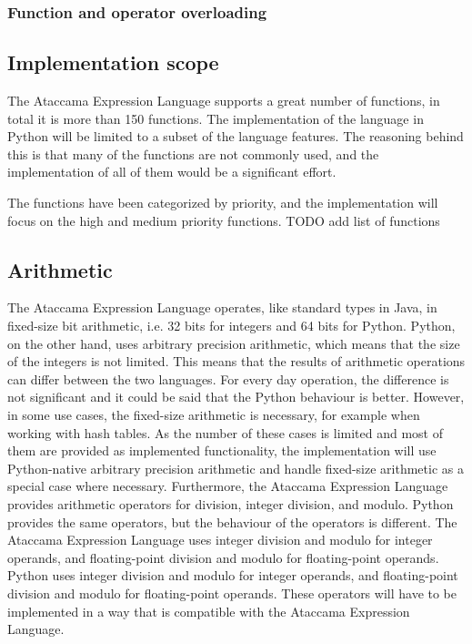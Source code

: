 \subsubsection{Function and operator overloading}

\subsection{Implementation scope}

The Ataccama Expression Language supports a great number of functions, in
total it is more than 150 functions.
The implementation of the language in Python will be limited to a subset of
the language features. The reasoning behind this is that many of the functions are
not commonly used, and the implementation of all of them would be a significant
effort.

The functions have been categorized by priority, and the implementation will
focus on the high and medium priority functions.
TODO add list of functions

\subsection{Arithmetic}
The Ataccama Expression Language operates, like standard types in Java, in
fixed-size bit arithmetic, i.e. 32 bits for integers and 64 bits for Python. Python,
on the other hand, uses arbitrary precision arithmetic, which means that the size
of the integers is not limited. This means that the results of arithmetic operations
can differ between the two languages.
For every day operation, the difference is not significant and it could be said
that the Python behaviour is better. However, in some use cases, the fixed-size
arithmetic is necessary, for example when working with hash tables. As the number
of these cases is limited and most of them are provided as implemented functionality,
the implementation will use Python-native arbitrary precision arithmetic and
handle fixed-size arithmetic as a special case where necessary.
Furthermore, the Ataccama Expression Language provides arithmetic operators
for division, integer division, and modulo. Python provides the same operators, but
the behaviour of the operators is different. The Ataccama Expression Language
uses integer division and modulo for integer operands, and floating-point division
and modulo for floating-point operands. Python uses integer division and modulo
for integer operands, and floating-point division and modulo for floating-point
operands. These operators will have to be implemented in a way that is compatible
with the Ataccama Expression Language.
